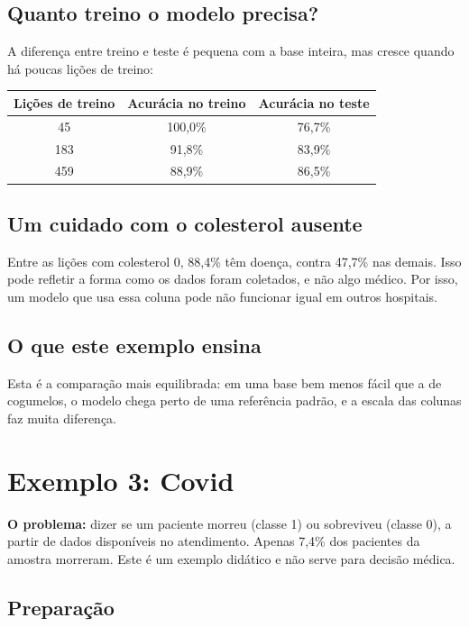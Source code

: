 \documentclass[11pt,a4paper]{article}
\newenvironment{tabela}{\par\nopagebreak[4]\vspace{0.3em}\nopagebreak[4]\begingroup\centering\small}{\par\endgroup\vspace{0.6em}}
\begin{document}
\subsection{Quanto treino o modelo precisa?}

A diferença entre treino e teste é pequena com a base inteira, mas cresce quando há poucas lições de treino:

\begin{tabela}
\begin{tabular}{ccc}
\toprule
Lições de treino & Acurácia no treino & Acurácia no teste\\
\midrule
45 & 100,0\% & 76,7\%\\
183 & 91,8\% & 83,9\%\\
459 & 88,9\% & 86,5\%\\
\bottomrule
\end{tabular}
\end{tabela}

\subsection{Um cuidado com o colesterol ausente}

Entre as lições com colesterol 0, 88,4\% têm doença, contra 47,7\% nas demais. Isso pode refletir a forma como os dados foram coletados, e não algo médico. Por isso, um modelo que usa essa coluna pode não funcionar igual em outros hospitais.

\subsection{O que este exemplo ensina}

Esta é a comparação mais equilibrada: em uma base bem menos fácil que a de cogumelos, o modelo chega perto de uma referência padrão, e a escala das colunas faz muita diferença.

\clearpage
\section{Exemplo 3: Covid}

\textbf{O problema:} dizer se um paciente morreu (classe 1) ou sobreviveu (classe 0), a partir de dados disponíveis no atendimento. Apenas 7,4\% dos pacientes da amostra morreram. Este é um exemplo didático e não serve para decisão médica.

\subsection{Preparação}
\end{document}
